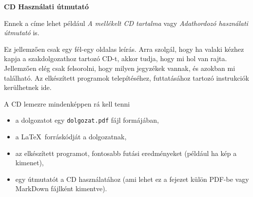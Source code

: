 \pagestyle{empty}

\noindent \textbf{\Large CD Használati útmutató}

\vskip 1cm

Ennek a címe lehet például \textit{A mellékelt CD tartalma} vagy \textit{Adathordozó használati útmutató} is.

Ez jellemzően csak egy fél-egy oldalas leírás.
Arra szolgál, hogy ha valaki kézhez kapja a szakdolgozathoz tartozó CD-t, akkor tudja, hogy mi hol van rajta.
Jellemzően elég csak felsorolni, hogy milyen jegyzékek vannak, és azokban mi található.
Az elkészített programok telepítéséhez, futtatásához tartozó instrukciók kerülhetnek ide.

A CD lemezre mindenképpen rá kell tenni
\begin{itemize}
\item a dolgozatot egy \texttt{dolgozat.pdf} fájl formájában,
\item a \LaTeX\ forráskódját a dolgozatnak,
\item az elkészített programot, fontosabb futási eredményeket (például ha kép a kimenet),
\item egy útmutatót a CD használatához (ami lehet ez a fejezet külön PDF-be vagy MarkDown fájlként kimentve).
\end{itemize}
